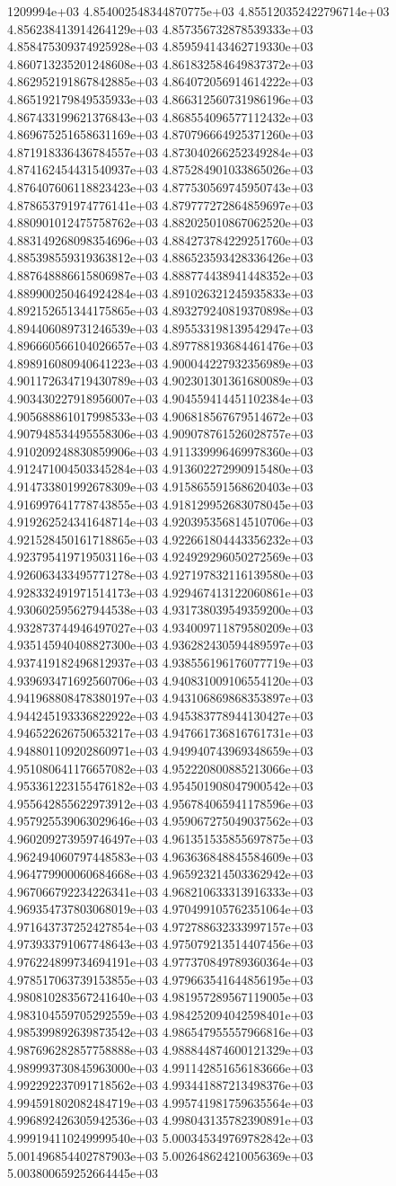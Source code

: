 1209994e+03	4.854002548344870775e+03	4.855120352422796714e+03	4.856238413914264129e+03	4.857356732878539333e+03	4.858475309374925928e+03	4.859594143462719330e+03	4.860713235201248608e+03	4.861832584649837372e+03	4.862952191867842885e+03	4.864072056914614222e+03	4.865192179849535933e+03	4.866312560731986196e+03	4.867433199621376843e+03	4.868554096577112432e+03	4.869675251658631169e+03	4.870796664925371260e+03	4.871918336436784557e+03	4.873040266252349284e+03	4.874162454431540937e+03	4.875284901033865026e+03	4.876407606118823423e+03	4.877530569745950743e+03	4.878653791974776141e+03	4.879777272864859697e+03	4.880901012475758762e+03	4.882025010867062520e+03	4.883149268098354696e+03	4.884273784229251760e+03	4.885398559319363812e+03	4.886523593428336426e+03	4.887648886615806987e+03	4.888774438941448352e+03	4.889900250464924284e+03	4.891026321245935833e+03	4.892152651344175865e+03	4.893279240819370898e+03	4.894406089731246539e+03	4.895533198139542947e+03	4.896660566104026657e+03	4.897788193684461476e+03	4.898916080940641223e+03	4.900044227932356989e+03	4.901172634719430789e+03	4.902301301361680089e+03	4.903430227918956007e+03	4.904559414451102384e+03	4.905688861017998533e+03	4.906818567679514672e+03	4.907948534495558306e+03	4.909078761526028757e+03	4.910209248830859906e+03	4.911339996469978360e+03	4.912471004503345284e+03	4.913602272990915480e+03	4.914733801992678309e+03	4.915865591568620403e+03	4.916997641778743855e+03	4.918129952683078045e+03	4.919262524341648714e+03	4.920395356814510706e+03	4.921528450161718865e+03	4.922661804443356232e+03	4.923795419719503116e+03	4.924929296050272569e+03	4.926063433495771278e+03	4.927197832116139580e+03	4.928332491971514173e+03	4.929467413122060861e+03	4.930602595627944538e+03	4.931738039549359200e+03	4.932873744946497027e+03	4.934009711879580209e+03	4.935145940408827300e+03	4.936282430594489597e+03	4.937419182496812937e+03	4.938556196176077719e+03	4.939693471692560706e+03	4.940831009106554120e+03	4.941968808478380197e+03	4.943106869868353897e+03	4.944245193336822922e+03	4.945383778944130427e+03	4.946522626750653217e+03	4.947661736816761731e+03	4.948801109202860971e+03	4.949940743969348659e+03	4.951080641176657082e+03	4.952220800885213066e+03	4.953361223155476182e+03	4.954501908047900542e+03	4.955642855622973912e+03	4.956784065941178596e+03	4.957925539063029646e+03	4.959067275049037562e+03	4.960209273959746497e+03	4.961351535855697875e+03	4.962494060797448583e+03	4.963636848845584609e+03	4.964779900060684668e+03	4.965923214503362942e+03	4.967066792234226341e+03	4.968210633313916333e+03	4.969354737803068019e+03	4.970499105762351064e+03	4.971643737252427854e+03	4.972788632333997157e+03	4.973933791067748643e+03	4.975079213514407456e+03	4.976224899734694191e+03	4.977370849789360364e+03	4.978517063739153855e+03	4.979663541644856195e+03	4.980810283567241640e+03	4.981957289567119005e+03	4.983104559705292559e+03	4.984252094042598401e+03	4.985399892639873542e+03	4.986547955557966816e+03	4.987696282857758888e+03	4.988844874600121329e+03	4.989993730845963000e+03	4.991142851656183666e+03	4.992292237091718562e+03	4.993441887213498376e+03	4.994591802082484719e+03	4.995741981759635564e+03	4.996892426305942536e+03	4.998043135782390891e+03	4.999194110249999540e+03	5.000345349769782842e+03	5.001496854402787903e+03	5.002648624210056369e+03	5.003800659252664445e+03